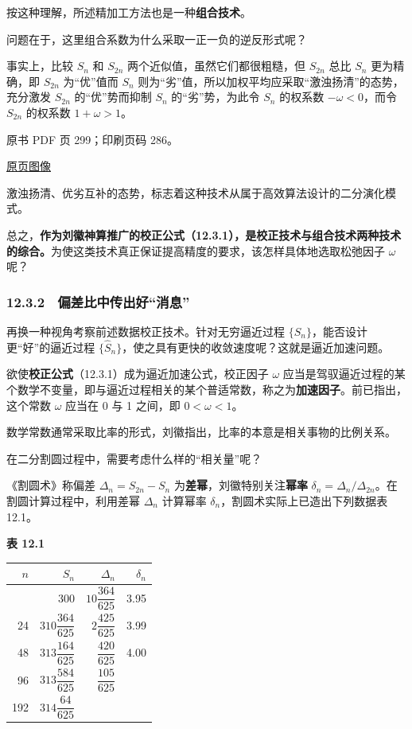 按这种理解，所述精加工方法也是一种\textbf{组合技术}。

问题在于，这里组合系数为什么采取一正一负的逆反形式呢？

事实上，比较 \(S_n\) 和 \(S_{2n}\) 两个近似值，虽然它们都很粗糙，但 \(S_{2n}\) 总比 \(S_n\) 更为精确，即 \(S_{2n}\) 为``优''值而 \(S_n\) 则为``劣''值，所以加权平均应采取``激浊扬清''的态势，充分激发 \(S_{2n}\) 的``优''势而抑制 \(S_n\) 的``劣''势，为此令 \(S_n\) 的权系数 \(-\omega<0\)，而令 \(S_{2n}\) 的权系数 \(1+\omega>1\)。

\clearpage

原书 PDF 页 299；印刷页码 286。

\href{source-images/pdf-299.jpeg}{原页图像}

激浊扬清、优劣互补的态势，标志着这种技术从属于高效算法设计的二分演化模式。

总之，\textbf{作为刘徽神算推广的校正公式（12.3.1），是校正技术与组合技术两种技术的综合。}为使这类技术真正保证提高精度的要求，该怎样具体地选取松弛因子 \(\omega\) 呢？

\subsubsection{12.3.2　偏差比中传出好``消息''}\label{ch12-ux504fux5deeux6bd4ux4e2dux4f20ux51faux597dux6d88ux606f}

再换一种视角考察前述数据校正技术。针对无穷逼近过程 \(\{S_n\}\)，能否设计更``好''的逼近过程 \(\{\widehat S_n\}\)，使之具有更快的收敛速度呢？这就是逼近加速问题。

欲使\textbf{校正公式}（12.3.1）成为逼近加速公式，校正因子 \(\omega\) 应当是驾驭逼近过程的某个数学不变量，即与逼近过程相关的某个普适常数，称之为\textbf{加速因子}。前已指出，这个常数 \(\omega\) 应当在 0 与 1 之间，即 \(0<\omega<1\)。

数学常数通常采取比率的形式，刘徽指出，比率的本意是相关事物的比例关系。

在二分割圆过程中，需要考虑什么样的``相关量''呢？

《割圆术》称偏差 \(\Delta_n=S_{2n}-S_n\) 为\textbf{差幂}，刘徽特别关注\textbf{幂率} \(\delta_n=\Delta_n/\Delta_{2n}\)。在割圆计算过程中，利用差幂 \(\Delta_n\) 计算幂率 \(\delta_n\)，割圆术实际上已造出下列数据表 12.1。

\textbf{表 12.1}

\begingroup
\renewcommand{\arraystretch}{2.2}
{\def\LTcaptype{none} %
\begin{longtable}[]{@{}rrrr@{}}
\toprule\noalign{}
\(n\) & \(S_n\) & \(\Delta_n\) & \(\delta_n\) \\
\midrule\noalign{}
\endhead
\bottomrule\noalign{}
\endlastfoot
12 & 300 & \(10\dfrac{364}{625}\) & 3.95 \\
24 & \(310\dfrac{364}{625}\) & \(2\dfrac{425}{625}\) & 3.99 \\
48 & \(313\dfrac{164}{625}\) & \(\dfrac{420}{625}\) & 4.00 \\
96 & \(313\dfrac{584}{625}\) & \(\dfrac{105}{625}\) & \\
192 & \(314\dfrac{64}{625}\) & & \\
\end{longtable}
}
\endgroup

